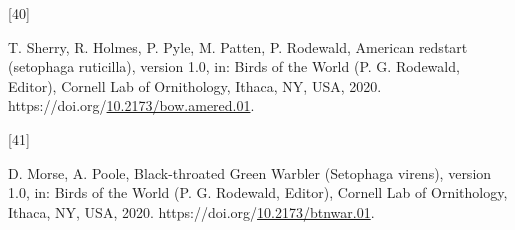\documentclass[manuscript, 3p, authoryear]{elsarticle} %
\newlength{\cslhangindent}
\newlength{\csllabelwidth}
\newlength{\cslentryspacingunit} %
\newenvironment{CSLReferences}[2] %
 {%
  \setlength{\parindent}{0pt}
  \ifodd #1
  \let\oldpar\par
  \def\par{\hangindent=\cslhangindent\oldpar}
  \fi
  \setlength{\parskip}{#2\cslentryspacingunit}
 }%
 {}
\newcommand{\CSLLeftMargin}[1]{\parbox[t]{\csllabelwidth}{#1}}
\newcommand{\CSLRightInline}[1]{\parbox[t]{\linewidth - \csllabelwidth}{#1}\break}
\begin{document}
\begin{CSLReferences}{0}{0}
\leavevmode{}%
\CSLLeftMargin{{[}40{]} }%
\CSLRightInline{T. Sherry, R. Holmes, P. Pyle, M. Patten, P. Rodewald, American redstart (setophaga ruticilla), version 1.0, in: Birds of the {World} ({P}. {G}. {Rodewald}, {Editor}), {Cornell Lab of Ornithology}, {Ithaca, NY, USA}, 2020. https://doi.org/\href{https://doi.org/10.2173/bow.amered.01}{10.2173/bow.amered.01}.}

\leavevmode{}%
\CSLLeftMargin{{[}41{]} }%
\CSLRightInline{D. Morse, A. Poole, Black-throated {Green Warbler} ({Setophaga} virens), version 1.0, in: Birds of the {World} ({P}. {G}. {Rodewald}, {Editor}), {Cornell Lab of Ornithology}, {Ithaca, NY, USA}, 2020. https://doi.org/\href{https://doi.org/10.2173/btnwar.01}{10.2173/btnwar.01}.}

\end{CSLReferences}

\pagebreak
\end{document}
